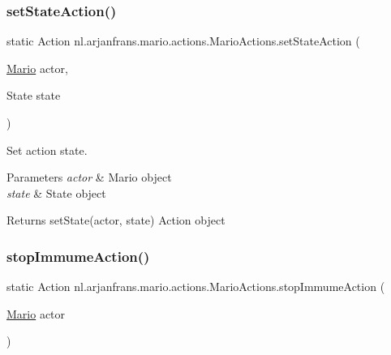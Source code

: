 \subsubsection{\texorpdfstring{set\+State\+Action()}{setStateAction()}}
{\footnotesize\ttfamily static Action nl.\+arjanfrans.\+mario.\+actions.\+Mario\+Actions.\+set\+State\+Action (\begin{DoxyParamCaption}\item[{\hyperlink{classnl_1_1arjanfrans_1_1mario_1_1model_1_1Mario}{Mario}}]{actor,  }\item[{State}]{state }\end{DoxyParamCaption})\hspace{0.3cm}{\ttfamily [static]}}



Set action state. 


\begin{DoxyParams}{Parameters}
{\em actor} & Mario object \\
\hline
{\em state} & State object \\
\hline
\end{DoxyParams}
\begin{DoxyReturn}{Returns}
set\+State(actor, state) Action object 
\end{DoxyReturn}
\mbox{\label{classnl_1_1arjanfrans_1_1mario_1_1actions_1_1MarioActions_ad04abb15058ffa3c3baf3a2301f4cf8c}} 
\subsubsection{\texorpdfstring{stop\+Immume\+Action()}{stopImmumeAction()}}
{\footnotesize\ttfamily static Action nl.\+arjanfrans.\+mario.\+actions.\+Mario\+Actions.\+stop\+Immume\+Action (\begin{DoxyParamCaption}\item[{\hyperlink{classnl_1_1arjanfrans_1_1mario_1_1model_1_1Mario}{Mario}}]{actor }\end{DoxyParamCaption})\hspace{0.3cm}{\ttfamily [static]}}



